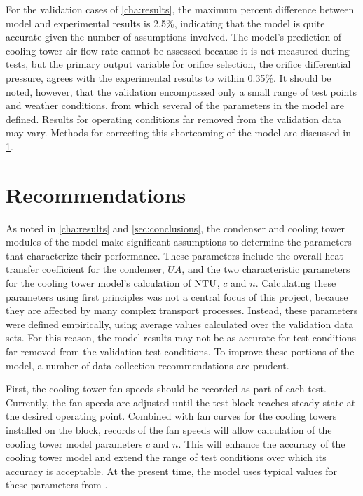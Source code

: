 For the validation cases of \cref{cha:results}, the maximum percent difference between model
and experimental results is 2.5\%, indicating that the model is quite accurate given the number of assumptions involved.
The model's prediction of cooling tower air flow rate cannot be assessed because
it is not measured during tests, but the primary output variable for 
orifice selection, the orifice differential pressure,
agrees with the experimental results to within 0.35\%.
It should be noted, however, that the validation encompassed only a
small range of test points and weather conditions, from which several
of the parameters in the model are defined.
Results for operating conditions far removed from the validation data
may vary.
Methods for correcting this shortcoming of the model are discussed in \cref{sec:recommend}.

\section{Recommendations} \label{sec:recommend}
As noted in \cref{cha:results} and \cref{sec:conclusions},
the condenser and cooling tower modules of the model make significant
assumptions to determine the parameters that characterize their performance.
These parameters include the overall heat transfer coefficient for the condenser, $UA$,
and the two characteristic parameters for the cooling tower model's 
calculation of $\mathrm{NTU}$, $c$ and $n$.
Calculating these parameters using first principles was not a central focus of this project, 
because they are affected by many complex transport processes.
Instead, these parameters were defined empirically, using average values calculated over the 
validation data sets.
For this reason, the model results may not be as accurate for test conditions
far removed from the validation test conditions.
To improve these portions of the model, a number of data collection
recommendations are prudent.

First, the cooling tower fan speeds should be recorded as part of each test.
Currently, the fan speeds are adjusted until the test block reaches steady state
at the desired operating point.
Combined with fan curves for the cooling towers installed on the block,
records of the fan speeds will allow calculation of the cooling tower
model parameters $c$ and $n$. 
This will enhance the accuracy of the cooling tower model and extend the range
of test conditions over which its accuracy is acceptable.
At the present time, the model uses typical values for these parameters from \textcite{braun1989}.

